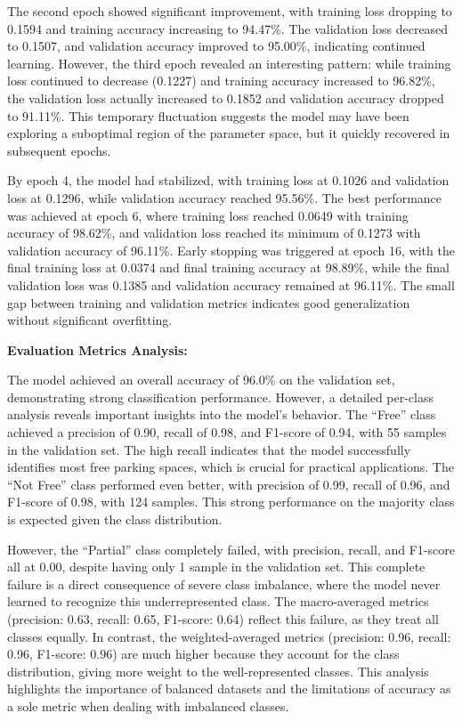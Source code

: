 \documentclass[12pt,a4paper]{article}
\begin{document}
The second epoch showed significant improvement, with training loss dropping to 0.1594 and training accuracy increasing to 94.47\%. The validation loss decreased to 0.1507, and validation accuracy improved to 95.00\%, indicating continued learning. However, the third epoch revealed an interesting pattern: while training loss continued to decrease (0.1227) and training accuracy increased to 96.82\%, the validation loss actually increased to 0.1852 and validation accuracy dropped to 91.11\%. This temporary fluctuation suggests the model may have been exploring a suboptimal region of the parameter space, but it quickly recovered in subsequent epochs.

By epoch 4, the model had stabilized, with training loss at 0.1026 and validation loss at 0.1296, while validation accuracy reached 95.56\%. The best performance was achieved at epoch 6, where training loss reached 0.0649 with training accuracy of 98.62\%, and validation loss reached its minimum of 0.1273 with validation accuracy of 96.11\%. Early stopping was triggered at epoch 16, with the final training loss at 0.0374 and final training accuracy at 98.89\%, while the final validation loss was 0.1385 and validation accuracy remained at 96.11\%. The small gap between training and validation metrics indicates good generalization without significant overfitting.

\textbf{Evaluation Metrics Analysis:}

The model achieved an overall accuracy of 96.0\% on the validation set, demonstrating strong classification performance. However, a detailed per-class analysis reveals important insights into the model's behavior. The ``Free'' class achieved a precision of 0.90, recall of 0.98, and F1-score of 0.94, with 55 samples in the validation set. The high recall indicates that the model successfully identifies most free parking spaces, which is crucial for practical applications. The ``Not Free'' class performed even better, with precision of 0.99, recall of 0.96, and F1-score of 0.98, with 124 samples. This strong performance on the majority class is expected given the class distribution.

However, the ``Partial'' class completely failed, with precision, recall, and F1-score all at 0.00, despite having only 1 sample in the validation set. This complete failure is a direct consequence of severe class imbalance, where the model never learned to recognize this underrepresented class. The macro-averaged metrics (precision: 0.63, recall: 0.65, F1-score: 0.64) reflect this failure, as they treat all classes equally. In contrast, the weighted-averaged metrics (precision: 0.96, recall: 0.96, F1-score: 0.96) are much higher because they account for the class distribution, giving more weight to the well-represented classes. This analysis highlights the importance of balanced datasets and the limitations of accuracy as a sole metric when dealing with imbalanced classes.
\end{document}
